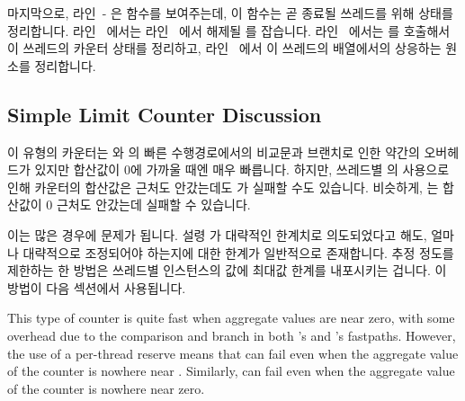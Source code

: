 \begin{lineref}
\begin{lineref}
마지막으로, 라인~- 은  함수를
보여주는데, 이 함수는 곧 종료될 쓰레드를 위해 상태를 정리합니다.
라인~ 에서는 라인~ 에서 해제될 
를 잡습니다.
라인~ 에서는  를 호출해서 이 쓰레드의
카운터 상태를 정리하고, 라인~ 에서 이 쓰레드의 
배열에서의 상응하는 원소를 정리합니다.

\end{lineref}

\subsection{Simple Limit Counter Discussion}
\label{sec:count:Simple Limit Counter Discussion}

이 유형의 카운터는  와  의 빠른 수행경로에서의
비교문과 브랜치로 인한 약간의 오버헤드가 있지만 합산값이 0에 가까울 때엔 매우
빠릅니다.
하지만, 쓰레드별  의 사용으로 인해 카운터의 합산값은
 근처도 안갔는데도  가 실패할 수도 있습니다.
비슷하게,  는 합산값이 0 근처도 안갔는데 실패할 수 있습니다.

이는 많은 경우에 문제가 됩니다.
설령  가 대략적인 한계치로 의도되었다고 해도, 얼마나
대략적으로 조정되어야 하는지에 대한 한계가 일반적으로 존재합니다.
추정 정도를 제한하는 한 방법은 쓰레드별  인스턴스의 값에 최대값
한계를 내포시키는 겁니다.
이 방법이 다음 섹션에서 사용됩니다.
\iffalse

This type of counter is quite fast when aggregate values are near zero,
with some overhead due to the comparison and branch in both
's and 's fastpaths.
However, the use of a per-thread  reserve means that
 can fail even when
the aggregate value of the counter is nowhere near .
Similarly,  can fail
even when the aggregate value of the counter is nowhere near zero.


\end{lineref}
